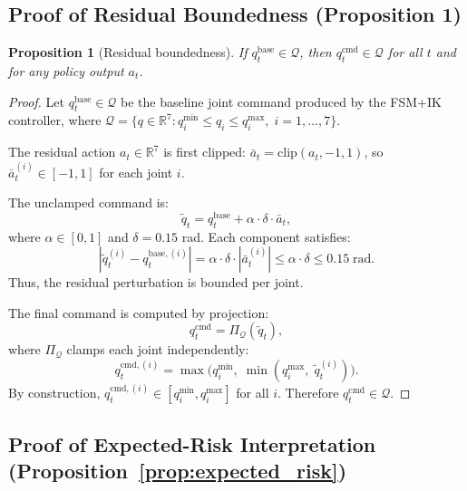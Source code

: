 \documentclass[10pt,twocolumn,letterpaper]{article}
\newtheorem{proposition}{Proposition}
\begin{document}
\subsection{Proof of Residual Boundedness (Proposition 1)}
\begin{proposition}[Residual boundedness]
\label{prop:boundedness}
If $q_t^{\mathrm{base}}\in\mathcal{Q}$, then $q_t^{\mathrm{cmd}}\in\mathcal{Q}$ for all $t$ and for any policy output $a_t$.
\end{proposition}

\begin{proof}
Let $q_t^{\mathrm{base}} \in \mathcal{Q}$ be the baseline joint command produced by the FSM+IK controller, where $\mathcal{Q} = \{q \in \mathbb{R}^7 : q_i^{\min} \le q_i \le q_i^{\max},\; i=1,\ldots,7\}$.

The residual action $a_t \in \mathbb{R}^7$ is first clipped: $\bar{a}_t = \mathrm{clip}(a_t, -1, 1)$, so $\bar{a}_t^{(i)} \in [-1, 1]$ for each joint $i$.

The unclamped command is:
\[
\tilde{q}_t = q_t^{\mathrm{base}} + \alpha \cdot \delta \cdot \bar{a}_t,
\]
where $\alpha \in [0,1]$ and $\delta = 0.15$ rad. Each component satisfies:
\[
|\tilde{q}_t^{(i)} - q_t^{\mathrm{base},(i)}| = \alpha \cdot \delta \cdot |\bar{a}_t^{(i)}| \le \alpha \cdot \delta \le 0.15 \;\text{rad}.
\]
Thus, the residual perturbation is bounded per joint.

The final command is computed by projection:
\[
q_t^{\mathrm{cmd}} = \Pi_{\mathcal{Q}}(\tilde{q}_t),
\]
where $\Pi_{\mathcal{Q}}$ clamps each joint independently:
\[
q_t^{\mathrm{cmd},(i)} = \max\!\bigl(q_i^{\min},\;\min(q_i^{\max},\;\tilde{q}_t^{(i)})\bigr).
\]
By construction, $q_t^{\mathrm{cmd},(i)} \in [q_i^{\min}, q_i^{\max}]$ for all $i$. Therefore $q_t^{\mathrm{cmd}} \in \mathcal{Q}$.
\end{proof}

\subsection{Proof of Expected-Risk Interpretation (Proposition~\ref{prop:expected_risk})}
\end{document}
